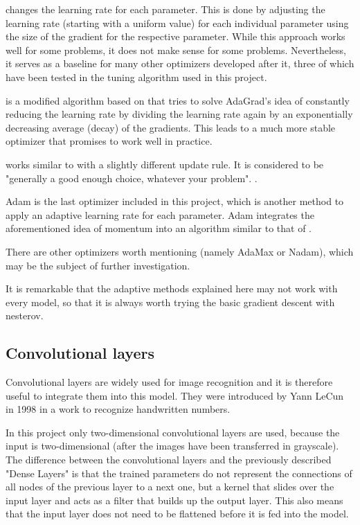  \cite{Duchi2010} changes the learning rate for each parameter.
This is done by adjusting the learning rate (starting with a uniform value) for each individual parameter using the size of the gradient for the respective parameter.
While this approach works well for some problems, it does not make sense for some problems.
Nevertheless, it serves as a baseline for many other optimizers developed after it, three of which have been tested in the tuning algorithm used in this project.

 \cite{Zeiler2012} is a modified algorithm based on  that tries to solve AdaGrad's idea of constantly reducing the learning rate by dividing the learning rate again by an exponentially decreasing average (decay) of the gradients.
This leads to a much more stable optimizer that promises to work well in practice.

 \cite{Hinton2012} works similar to  with a slightly different update rule.
It is considered to be "generally a good enough choice, whatever your problem". \cite [p.77]{Chollet2017}.

Adam \cite{Kingma2014}\cite{Reddi2018} is the last optimizer included in this project, which is another method to apply an adaptive learning rate for each parameter.
Adam integrates the aforementioned idea of momentum into an algorithm similar to that of .

There are other optimizers worth mentioning (namely AdaMax or Nadam), which may be the subject of further investigation.

It is remarkable that the adaptive methods explained here may not work with every model, so that it is always worth trying the basic gradient descent with nesterov\cite [p.358]{Geron2019}.

\subsection{Convolutional layers}

Convolutional layers are widely used for image recognition and it is therefore useful to integrate them into this model.
They were introduced by Yann LeCun in 1998 in a work \cite{Lecun1998} to recognize handwritten numbers.

In this project only two-dimensional convolutional layers are used, because the input is two-dimensional (after the images have been transferred in grayscale).
The difference between the convolutional layers and the previously described "Dense Layers" is that the trained parameters do not represent the connections of all nodes of the previous layer to a next one, but a kernel that slides over the input layer and acts as a filter that builds up the output layer.
This also means that the input layer does not need to be flattened before it is fed into the model.

